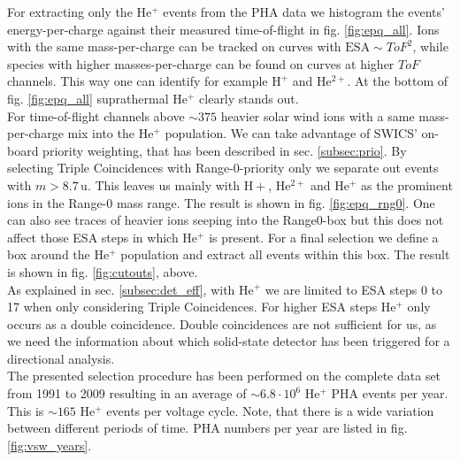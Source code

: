 For extracting only the $\mathrm{He^{+}}$ events from the PHA data we histogram the events' energy-per-charge against their measured time-of-flight in fig. \ref{fig:epq_all}. 
Ions with the same mass-per-charge can be tracked on curves with $\mathrm{ESA} \sim ToF^2$, while species with higher masses-per-charge can be found on curves at higher $ToF$ channels. This way one can identify for example $\mathrm{H^{+}}$ and $\mathrm{He^{2+}}$. At the bottom of fig. \ref{fig:epq_all} suprathermal $\mathrm{He^{+}}$ clearly stands out.\\
For time-of-flight channels above $\sim 375$ heavier solar wind ions with a same mass-per-charge mix into the $\mathrm{He^{+}}$ population.
We can take advantage of SWICS' on-board priority weighting, that has been described in sec. \ref{subsec:prio}. By selecting Triple Coincidences with Range-0-priority only we separate out events with $m>8.7\,\mathrm{u}$. This leaves us mainly with $\mathrm{H+}$, $\mathrm{He^{2+}}$ and $\mathrm{He^{+}}$ as the prominent ions in the Range-0 mass range. The result is shown in fig. \ref{fig:epq_rng0}. One can also see traces of heavier ions seeping into the Range0-box but this does not affect those ESA steps in which $\mathrm{He^{+}}$ is present.
For a final selection we define a box around the $\mathrm{He^{+}}$ population and extract all events within this box. The result is shown in fig. \ref{fig:cutouts}, above.
\\
As explained in sec. \ref{subsec:det_eff}, with $\mathrm{He^{+}}$ we are limited to ESA steps 0 to 17 when only considering Triple Coincidences. For higher ESA steps $\mathrm{He^{+}}$ only occurs as a double coincidence. Double coincidences are not sufficient for us, as we need the information about which solid-state detector has been triggered for a directional analysis.
\\
The presented selection procedure has been performed on the complete data set from 1991 to 2009 resulting in an average of $\sim 6.8\cdot10^{6}$ $\mathrm{He^{+}}$ PHA events per year. This is $\sim 165$ $\mathrm{He^{+}}$ events per voltage cycle. Note, that there is a wide variation between different periods of time. PHA numbers per year are listed in fig. \ref{fig:vsw_years}.
%
%
%

